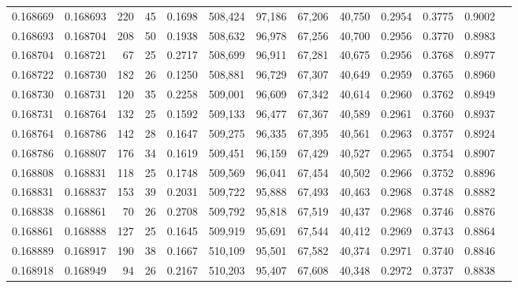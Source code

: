 \begin{tabular}{rrrrrrrrrrrrr}
0.168669 & 0.168693 & 220 &  45 &                                     0.1698 & 508,424 &  97,186 &  67,206 &  40,750 & 0.2954 & 0.3775 & 0.9002 \\
0.168693 & 0.168704 & 208 &  50 &                                     0.1938 & 508,632 &  96,978 &  67,256 &  40,700 & 0.2956 & 0.3770 & 0.8983 \\
0.168704 & 0.168721 &  67 &  25 &                                     0.2717 & 508,699 &  96,911 &  67,281 &  40,675 & 0.2956 & 0.3768 & 0.8977 \\
0.168722 & 0.168730 & 182 &  26 &                                     0.1250 & 508,881 &  96,729 &  67,307 &  40,649 & 0.2959 & 0.3765 & 0.8960 \\
0.168730 & 0.168731 & 120 &  35 &                                     0.2258 & 509,001 &  96,609 &  67,342 &  40,614 & 0.2960 & 0.3762 & 0.8949 \\
0.168731 & 0.168764 & 132 &  25 &                                     0.1592 & 509,133 &  96,477 &  67,367 &  40,589 & 0.2961 & 0.3760 & 0.8937 \\
0.168764 & 0.168786 & 142 &  28 &                                     0.1647 & 509,275 &  96,335 &  67,395 &  40,561 & 0.2963 & 0.3757 & 0.8924 \\
0.168786 & 0.168807 & 176 &  34 &                                     0.1619 & 509,451 &  96,159 &  67,429 &  40,527 & 0.2965 & 0.3754 & 0.8907 \\
0.168808 & 0.168831 & 118 &  25 &                                     0.1748 & 509,569 &  96,041 &  67,454 &  40,502 & 0.2966 & 0.3752 & 0.8896 \\
0.168831 & 0.168837 & 153 &  39 &                                     0.2031 & 509,722 &  95,888 &  67,493 &  40,463 & 0.2968 & 0.3748 & 0.8882 \\
0.168838 & 0.168861 &  70 &  26 &                                     0.2708 & 509,792 &  95,818 &  67,519 &  40,437 & 0.2968 & 0.3746 & 0.8876 \\
0.168861 & 0.168888 & 127 &  25 &                                     0.1645 & 509,919 &  95,691 &  67,544 &  40,412 & 0.2969 & 0.3743 & 0.8864 \\
0.168889 & 0.168917 & 190 &  38 &                                     0.1667 & 510,109 &  95,501 &  67,582 &  40,374 & 0.2971 & 0.3740 & 0.8846 \\
0.168918 & 0.168949 &  94 &  26 &                                     0.2167 & 510,203 &  95,407 &  67,608 &  40,348 & 0.2972 & 0.3737 & 0.8838 \\

\end{tabular}
